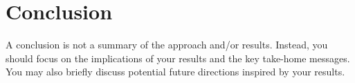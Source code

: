 
\section{Conclusion}
\label{sec:conclusion}

A conclusion is not a summary of the approach and/or results. Instead, you should focus on the implications of your results and the key take-home messages. You may also briefly discuss potential future directions inspired by your results.
